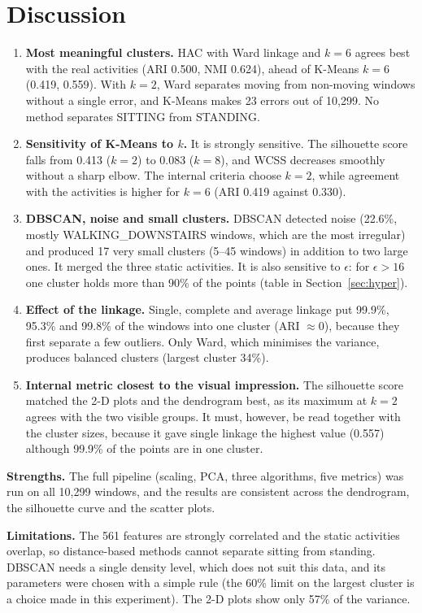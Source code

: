 \documentclass[12pt,a4paper]{article}
\begin{document}
\section{Discussion}
\begin{enumerate}[leftmargin=*]
\item \textbf{Most meaningful clusters.} HAC with Ward linkage and $k=6$ agrees best with the real activities (ARI 0.500, NMI 0.624), ahead of K-Means $k=6$ (0.419, 0.559). With $k=2$, Ward separates moving from non-moving windows without a single error, and K-Means makes 23 errors out of 10,299. No method separates SITTING from STANDING.
\item \textbf{Sensitivity of K-Means to $k$.} It is strongly sensitive. The silhouette score falls from 0.413 ($k=2$) to 0.083 ($k=8$), and WCSS decreases smoothly without a sharp elbow. The internal criteria choose $k=2$, while agreement with the activities is higher for $k=6$ (ARI 0.419 against 0.330).
\item \textbf{DBSCAN, noise and small clusters.} DBSCAN detected noise (22.6\%, mostly WALKING\_DOWNSTAIRS windows, which are the most irregular) and produced 17 very small clusters (5--45 windows) in addition to two large ones. It merged the three static activities. It is also sensitive to $\epsilon$: for $\epsilon>16$ one cluster holds more than 90\% of the points (table in Section~\ref*{sec:hyper}).
\item \textbf{Effect of the linkage.} Single, complete and average linkage put 99.9\%, 95.3\% and 99.8\% of the windows into one cluster (ARI $\approx 0$), because they first separate a few outliers. Only Ward, which minimises the variance, produces balanced clusters (largest cluster 34\%).
\item \textbf{Internal metric closest to the visual impression.} The silhouette score matched the 2-D plots and the dendrogram best, as its maximum at $k=2$ agrees with the two visible groups. It must, however, be read together with the cluster sizes, because it gave single linkage the highest value (0.557) although 99.9\% of the points are in one cluster.
\end{enumerate}

\textbf{Strengths.} The full pipeline (scaling, PCA, three algorithms, five metrics) was run on all 10,299 windows, and the results are consistent across the dendrogram, the silhouette curve and the scatter plots.

\textbf{Limitations.} The 561 features are strongly correlated and the static activities overlap, so distance-based methods cannot separate sitting from standing. DBSCAN needs a single density level, which does not suit this data, and its parameters were chosen with a simple rule (the 60\% limit on the largest cluster is a choice made in this experiment). The 2-D plots show only 57\% of the variance.
\end{document}
